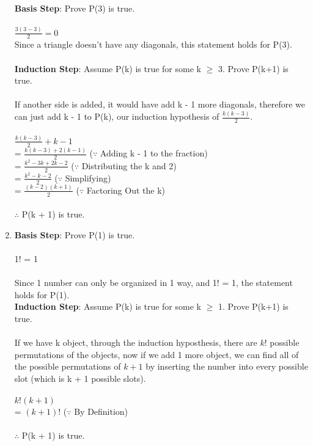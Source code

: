 \documentclass[12pt]{article}
\begin{document}
\begin{enumerate}[label = (\alph*)]
        \textbf{Basis Step}: Prove P(3) is true. \\
        \\
        $\frac{3(3-3)}{2} = 0$
        \\
        Since a triangle doesn't have any diagonals, this statement holds for P(3). \\
        \\
        \textbf{Induction Step}: Assume P(k) is true for some k $\geq$ 3. Prove P(k+1)
                                is true. \\
        \\
        If another side is added, it would have add k - 1 more diagonals, therefore we can just
        add k - 1 to P(k), our induction hypothesis of $\frac{k(k-3)}{2}$. \\
        \\
        $\frac{k(k-3)}{2} + k - 1$ \\
        = $\frac{k(k-3) + 2(k-1)}{2}$ \hspace{6em} ($\because$ Adding k - 1 to the fraction) \\
        = $\frac{k^2 - 3k + 2k - 2}{2}$ \hspace{6em} ($\because$ Distributing the k and 2) \\
        = $\frac{k^2 - k - 2}{2}$ \hspace{6em} ($\because$ Simplifying) \\
        = $\frac{(k - 2)(k + 1)}{2}$ \hspace{6em} ($\because$ Factoring Out the k) \\
        \\
        $\therefore$ P(k + 1) is true.

    \item 
    
        \textbf{Basis Step}: Prove P(1) is true. \\
        \\
        1! = 1 \\
        \\
        Since 1 number can only be organized in 1 way, and 1! = 1, the statement holds for P(1).
        \\
        \textbf{Induction Step}: Assume P(k) is true for some k $\geq$ 1. Prove P(k+1)
                                is true. \\
        \\
        If we have k object, through the induction hyposthesis, there are $k!$ possible permutations
        of the objects, now if we add 1 more object, we can find all of the possible permutations
        of $k+1$ by inserting the number into every possible slot (which is k + 1 possible slots). \\
        \\
        $k!(k + 1)$ \\
        = $(k+1)!$ \hspace{6em} ($\because$ By Definition) \\
        \\
        $\therefore$ P(k + 1) is true.

\end{enumerate}
\end{document}
